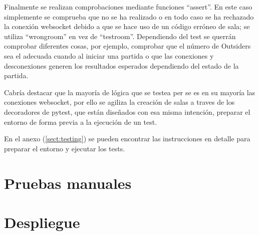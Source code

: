 Finalmente se realizan comprobaciones mediante funciones ``assert''. En este caso simplemente se comprueba que no se ha realizado
o en todo caso se ha rechazado la conexión websocket debido a que se hace uso de un código erróneo de sala; se utiliza ``wrong\textunderscore room''
en vez de ``test\textunderscore room''. Dependiendo del test se querrán comprobar diferentes cosas, por ejemplo, comprobar que el número de Outsiders sea
el adecuada cuando al iniciar una partida o que las conexiones y desconexiones generen los resultados esperados dependiendo del estado de la partida.

Cabría destacar que la mayoría de lógica que se testea per se es en su mayoría las conexiones websocket, por ello se agiliza la creación de salas
a traves de los decoradores de pytest, que están diseñados con esa misma intención, preparar el entorno de forma previa a la ejecución de 
un test. 

En el anexo (\ref{sect:testing}) se pueden encontrar las instrucciones en detalle para preparar el entorno y ejecutar los tests.

\section{Pruebas manuales}

\section{Despliegue}


